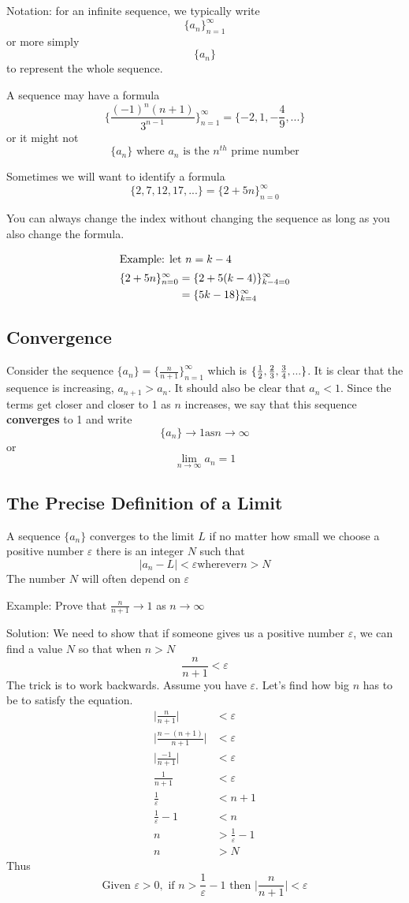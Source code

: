 \documentclass[12pt]{article}
\begin{document}
Notation: for an infinite sequence, we typically write \[ \{a_n\}_{n=1}^\infty \] or more simply \[ \{a_n\} \] to represent the whole sequence.

A sequence may have a formula \[ \{\frac{(-1)^n(n+1)}{3^{n-1}}\}_{n=1}^\infty = \{-2,1,-\frac{4}{9},...\} \] or it might not \[ \{a_n\} \text{ where $a_n$ is the $n^{th}$ prime number} \]

Sometimes we will want to identify a formula \[ \{2,7,12,17,...\} = \{2+5n\}_{n=0}^\infty \]

You can always change the index without changing the sequence as long as you also change the formula.

\begin{align*}
\intertext{Example: let $n = k-4$}
\{2+5n\}_{n=0}^\infty &= \{2+5(k-4)\}_{k-4=0}^\infty\\
&= \{5k-18\}_{k=4}^\infty
\end{align*}

\subsection*{Convergence}
Consider the sequence $\{a_n\} = \{\frac{n}{n+1}\}_{n=1}^\infty$ which is $\{\frac{1}{2} ,\frac{2}{3},\frac{3}{4},...\}$. It is clear that the sequence is increasing, $a_{n+1} > a_n$. It should also be clear that $a_n < 1$. Since the terms get closer and closer to 1 as $n$ increases, we say that this sequence {\bf converges} to 1 and write \[ \{a_n\}\to 1 \text{as} n\to\infty \] or \[ \displaystyle\lim_{n\to\infty}a_n = 1 \]

\subsection*{The Precise Definition of a Limit}
A sequence $\{a_n\}$ converges to the limit $L$ if no matter how small we choose a positive number $\varepsilon$ there is an integer $N$ such that \[ |a_n-L| < \varepsilon \text{wherever} n > N \] The number $N$ will often depend on $\varepsilon$

Example: Prove that $\frac{n}{n+1} \to 1$ as $n \to\infty$

Solution: We need to show that if someone gives us a positive number $\varepsilon$, we can find a value $N$ so that when $n>N$ \[ \frac{n}{n+1} < \varepsilon \] The trick is to work backwards. Assume you have $\varepsilon$. Let's find how big $n$ has to be to satisfy the equation.
\begin{align*}
\bigg|\frac{n}{n+1}\bigg| &< \varepsilon\\
\bigg|\frac{n-(n+1)}{n+1}\bigg| &< \varepsilon\\
\bigg|\frac{-1}{n+1}\bigg| &< \varepsilon\\
\frac{1}{n+1} &< \varepsilon\\
\frac{1}{\varepsilon} &< n+1\\
\frac{1}{\varepsilon} - 1 &< n\\
n &> \frac{1}{\varepsilon} - 1\\
n &> N
\end{align*}
Thus \[ \text{Given } \varepsilon > 0, \text{ if } n > \frac{1}{\varepsilon} - 1 \text{ then } \bigg|\frac{n}{n+1}\bigg| < \varepsilon \]
\end{document}
